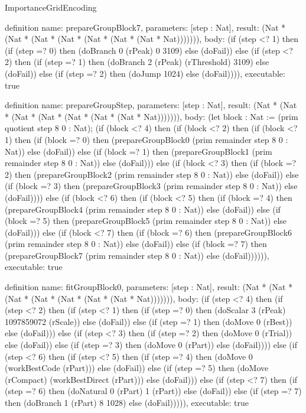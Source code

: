 \begin{lexlean}{ImportanceGridEncoding}
\begin{semanticmodule}
definition{
  name: prepareGroupBlock7,
  parameters: [step : Nat],
  result: (Nat * (Nat * (Nat * (Nat * (Nat * (Nat * (Nat * Nat))))))),
  body: (if (step <? 1) then
      (if (step =? 0) then (doBranch 0 (rPeak) 0 3109) else (doFail)) else
      (if (step <? 2) then
      (if (step =? 1) then (doBranch 2 (rPeak) (rThreshold) 3109) else (doFail)) else
      (if (step =? 2) then (doJump 1024) else (doFail)))),
  executable: true
}

definition{
  name: prepareGroupStep,
  parameters: [step : Nat],
  result: (Nat * (Nat * (Nat * (Nat * (Nat * (Nat * (Nat * Nat))))))),
  body: (let block : Nat := (prim quotient step 8 0 : Nat); (if (block <? 4) then
      (if (block <? 2) then
      (if (block <? 1) then
      (if (block =? 0) then (prepareGroupBlock0 (prim remainder step 8 0 : Nat)) else (doFail)) else
      (if (block =? 1) then (prepareGroupBlock1 (prim remainder step 8 0 : Nat)) else (doFail))) else
      (if (block <? 3) then
      (if (block =? 2) then (prepareGroupBlock2 (prim remainder step 8 0 : Nat)) else (doFail)) else
      (if (block =? 3) then (prepareGroupBlock3 (prim remainder step 8 0 : Nat)) else (doFail)))) else
      (if (block <? 6) then
      (if (block <? 5) then
      (if (block =? 4) then (prepareGroupBlock4 (prim remainder step 8 0 : Nat)) else (doFail)) else
      (if (block =? 5) then (prepareGroupBlock5 (prim remainder step 8 0 : Nat)) else (doFail))) else
      (if (block <? 7) then
      (if (block =? 6) then (prepareGroupBlock6 (prim remainder step 8 0 : Nat)) else (doFail)) else
      (if (block =? 7) then (prepareGroupBlock7 (prim remainder step 8 0 : Nat)) else (doFail)))))),
  executable: true
}

definition{
  name: fitGroupBlock0,
  parameters: [step : Nat],
  result: (Nat * (Nat * (Nat * (Nat * (Nat * (Nat * (Nat * Nat))))))),
  body: (if (step <? 4) then
      (if (step <? 2) then
      (if (step <? 1) then
      (if (step =? 0) then (doScalar 3 (rPeak) 1097859072 (rScale)) else (doFail)) else
      (if (step =? 1) then (doMove 0 (rBest)) else (doFail))) else
      (if (step <? 3) then
      (if (step =? 2) then (doMove 0 (rTrial)) else (doFail)) else
      (if (step =? 3) then (doMove 0 (rPart)) else (doFail)))) else
      (if (step <? 6) then
      (if (step <? 5) then
      (if (step =? 4) then (doMove 0 (workBestCode (rPart))) else (doFail)) else
      (if (step =? 5) then (doMove (rCompact) (workBestDirect (rPart))) else (doFail))) else
      (if (step <? 7) then
      (if (step =? 6) then (doNatural 0 (rPart) 1 (rPart)) else (doFail)) else
      (if (step =? 7) then (doBranch 1 (rPart) 8 1028) else (doFail))))),
  executable: true
}


\end{semanticmodule}
\end{lexlean}
